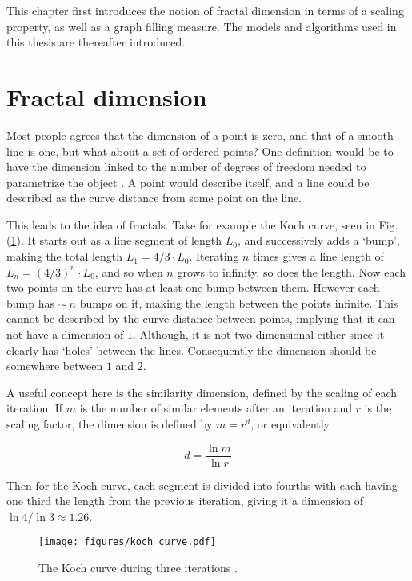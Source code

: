 This chapter first introduces the notion of fractal dimension in terms of a scaling property, as well as a graph filling measure. The models and algorithms used in this thesis are thereafter introduced.

\section{Fractal dimension}

Most people agrees that the dimension of a point is zero, and that of a smooth line is one, but what about a set of ordered points? One definition would be to have the dimension linked to the number of degrees of freedom needed to parametrize the object \cite{strogatz:dynamics_chaos}. A point would describe itself, and a line could be described as the curve distance from some point on the line.

This leads to the idea of fractals. Take for example the Koch curve, seen in Fig. (\ref{fig:koch_curve}). It starts out as a line segment of length $L_0$, and successively adds a `bump', making the total length $L_1 = 4/3 \cdot L_0$. Iterating $n$ times gives a line length of $L_n = {(4 / 3)}^n \cdot L_0$, and so when $n$ grows to infinity, so does the length. Now each two points on the curve has at least one bump between them. However each bump has $\sim\ n$ bumps on it, making the length between the points infinite. This cannot be described by the curve distance between points, implying that it can not have a dimension of $1$. Although, it is not two-dimensional either since it clearly has `holes' between the lines. Consequently the dimension should be somewhere between $1$ and $2$.

A useful concept here is the similarity dimension, defined by the scaling of each iteration. If $m$ is the number of similar elements after an iteration and $r$ is the scaling factor, the dimension is defined by $m = r^d$, or equivalently

\begin{equation}
	d = \frac{\ln m}{\ln r}
\label{eq:similarityDimension}
\end{equation}

Then for the Koch curve, each segment is divided into fourths with each having one third the length from the previous iteration, giving it a dimension of $\ln 4 / \ln 3 \approx 1.26$.

\begin{figure}[h!]
    \centering
        \texttt{[image: figures/koch\_curve.pdf]}
    \caption{The Koch curve during three iterations \cite{strogatz:dynamics_chaos}.}
    \label{fig:koch_curve}
\end{figure}

